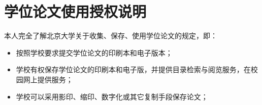

\vspace{7em}

\section*{学位论文使用授权说明}
\vspace{1em}

本人完全了解北京大学关于收集、保存、使用学位论文的规定，即：
\begin{itemize}
	\item 按照学校要求提交学位论文的印刷本和电子版本；
	\item 学校有权保存学位论文的印刷本和电子版，并提供目录检索与阅览服务，在校园网上提供服务；
	\item 学校可以采用影印、缩印、数字化或其它复制手段保存论文；
\end{itemize}

\vspace{4em}


